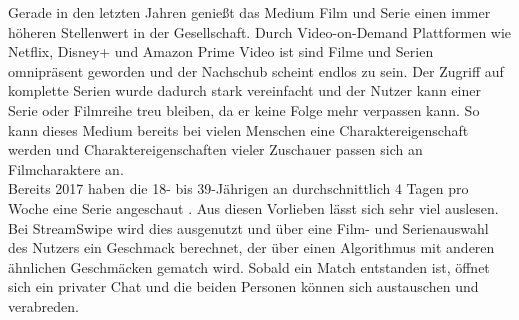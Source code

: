 Gerade in den letzten Jahren genießt das Medium Film und Serie einen immer höheren Stellenwert in der Gesellschaft. Durch Video-on-Demand Plattformen wie Netflix, Disney+ und Amazon Prime Video ist  sind Filme und Serien omnipräsent geworden und der Nachschub scheint endlos zu sein. Der Zugriff auf komplette Serien wurde dadurch stark vereinfacht und der Nutzer kann einer Serie oder Filmreihe treu bleiben, da er keine Folge mehr verpassen kann. So kann dieses Medium bereits bei vielen Menschen eine Charaktereigenschaft werden und Charaktereigenschaften vieler Zuschauer passen sich an Filmcharaktere an.\\
Bereits 2017 haben die 18- bis 39-Jährigen an durchschnittlich 4 Tagen pro Woche eine Serie angeschaut \cite{serienkonsum}. Aus diesen Vorlieben lässt sich sehr viel auslesen. Bei StreamSwipe wird dies ausgenutzt und über eine Film- und Serienauswahl des Nutzers ein Geschmack berechnet, der über einen Algorithmus mit anderen ähnlichen Geschmäcken gematch wird. Sobald ein Match entstanden ist, öffnet sich ein privater Chat und die beiden Personen können sich austauschen und verabreden.